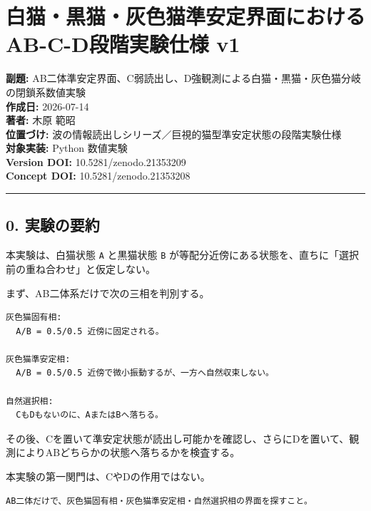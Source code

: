 \documentclass{article}
\begin{document}
\section{白猫・黒猫・灰色猫準安定界面におけるAB-C-D段階実験仕様
v1}\label{ux767dux732bux9ed2ux732bux7070ux8272ux732bux6e96ux5b89ux5b9aux754cux9762ux306bux304aux3051ux308bab-c-dux6bb5ux968eux5b9fux9a13ux4ed5ux69d8-v1}

\textbf{副題:}
AB二体準安定界面、C弱読出し、D強観測による白猫・黒猫・灰色猫分岐の閉鎖系数値実験\\
\textbf{作成日:} 2026-07-14\\
\textbf{著者:} 木原 範昭\\
\textbf{位置づけ:}
波の情報読出しシリーズ／巨視的猫型準安定状態の段階実験仕様\\
\textbf{対象実装:} Python 数値実験\\
\textbf{Version DOI:} 10.5281/zenodo.21353209\\
\textbf{Concept DOI:} 10.5281/zenodo.21353208

\begin{center}\rule{0.5\linewidth}{0.5pt}\end{center}

\subsection{0. 実験の要約}\label{ux5b9fux9a13ux306eux8981ux7d04}

本実験は、白猫状態 \texttt{A} と黒猫状態 \texttt{B}
が等配分近傍にある状態を、直ちに「選択前の重ね合わせ」と仮定しない。

まず、AB二体系だけで次の三相を判別する。

\begin{verbatim}
灰色猫固有相:
  A/B = 0.5/0.5 近傍に固定される。

灰色猫準安定相:
  A/B = 0.5/0.5 近傍で微小振動するが、一方へ自然収束しない。

自然選択相:
  CもDもないのに、AまたはBへ落ちる。
\end{verbatim}

その後、Cを置いて準安定状態が読出し可能かを確認し、さらにDを置いて、観測によりABどちらかの状態へ落ちるかを検査する。

本実験の第一関門は、CやDの作用ではない。

\begin{verbatim}
AB二体だけで、灰色猫固有相・灰色猫準安定相・自然選択相の界面を探すこと。
\end{verbatim}
\end{document}
